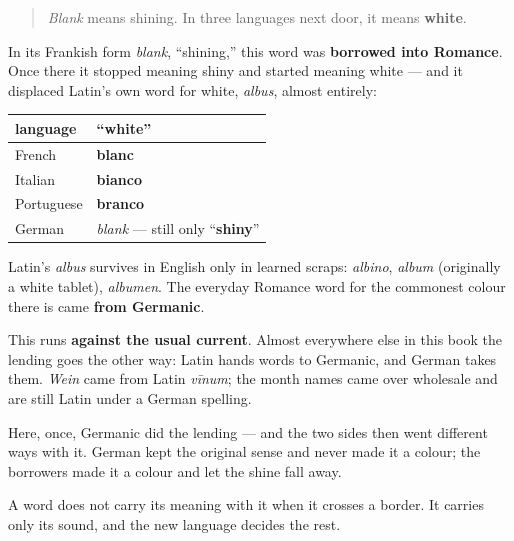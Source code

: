 \label{lesson:GE-C13-blank-blanc}



\begin{quote}
\emph{Blank} means shining. In three languages next door, it means \textbf{white}.
\end{quote}

\begin{cousinweb}
In its Frankish form \emph{blank}, \textquotedblleft{}shining,\textquotedblright{} this word was \textbf{borrowed into Romance}. Once there it stopped meaning shiny and started meaning white — and it displaced Latin's own word for white, \emph{albus}, almost entirely:

\noindent
\begin{tabularx}{\linewidth}{@{}>{\raggedright\arraybackslash}X>{\raggedright\arraybackslash}X@{}}
\toprule
\textbf{language} & \textbf{\textquotedblleft{}white\textquotedblright{}} \\
\midrule
French & \textbf{blanc} \\
Italian & \textbf{bianco} \\
Portuguese & \textbf{branco} \\
German & \emph{blank} — still only \textquotedblleft{}\textbf{shiny}\textquotedblright{} \\
\bottomrule
\end{tabularx}

Latin's \emph{albus} survives in English only in learned scraps: \emph{albino}, \emph{album} (originally a white tablet), \emph{albumen}. The everyday Romance word for the commonest colour there is came \textbf{from Germanic}.
\end{cousinweb}

\begin{culture}
This runs \textbf{against the usual current}. Almost everywhere else in this book the lending goes the other way: Latin hands words to Germanic, and German takes them. \emph{Wein} came from Latin \emph{vīnum}; the month names came over wholesale and are still Latin under a German spelling.

Here, once, Germanic did the lending — and the two sides then went different ways with it. German kept the original sense and never made it a colour; the borrowers made it a colour and let the shine fall away.

A word does not carry its meaning with it when it crosses a border. It carries only its sound, and the new language decides the rest.
\end{culture}

